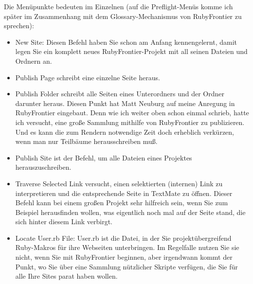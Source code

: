 \documentclass[11pt]{report}
\begin{document}
Die Menüpunkte bedeuten im Einzelnen (auf die Preflight-Menüs komme
ich später im Zusammenhang mit dem Glossary-Mechanismus von
RubyFrontier zu sprechen):


\begin{itemize}
\item New Site: Diesen Befehl haben Sie schon am Anfang kennengelernt,
  damit legen Sie ein komplett neues RubyFrontier-Projekt mit all
  seinen Dateien und Ordnern an.
\end{itemize}


\begin{itemize}
\item Publish Page schreibt eine einzelne Seite heraus.
\item Publish Folder schreibt alle Seiten eines Unterordners und der
  Ordner darunter heraus. Diesen Punkt hat Matt Neuburg auf meine
  Anregung in RubyFrontier eingebaut. Denn wie ich weiter oben schon
  einmal schrieb, hatte ich versucht, eine große Sammlung mithilfe von
  RubyFrontier zu publizieren. Und es kann die zum Rendern notwendige
  Zeit doch erheblich verkürzen, wenn man nur Teilbäume
  herausschreiben muß.
\end{itemize}


\begin{itemize}
\item Publish Site ist der Befehl, um alle Dateien eines Projektes
  herauszuschreiben.
\end{itemize}


\begin{itemize}
\item Traverse Selected Link versucht, einen selektierten (internen) Link
  zu interpretieren und die entsprechende Seite in TextMate zu
  öffnen. Dieser Befehl kann bei einem großen Projekt sehr hilfreich
  sein, wenn Sie zum Beispiel herausfinden wollen, was eigentlich noch
  mal auf der Seite stand, die sich hinter diesem Link verbirgt.
\end{itemize}


\begin{itemize}
\item Locate User.rb File: User.rb ist die Datei, in der Sie
  projektübergreifend Ruby-Makros für ihre Webseiten unterbringen. Im
  Regelfalle nutzen Sie sie nicht, wenn Sie mit RubyFrontier beginnen,
  aber irgendwann kommt der Punkt, wo Sie über eine Sammlung
  nützlicher Skripte verfügen, die Sie für alle Ihre Sites parat haben
  wollen.
\end{itemize}
\end{document}
